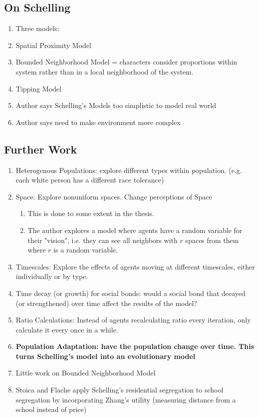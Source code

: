 \documentclass[11pt]{article}
\begin{document}
\subsection{On Schelling}
    \begin{enumerate}
        \item Three models:
        \item Spatial Proximity Model
        \item Bounded Neighborhood Model = characters consider proportions within system rather than in a local neighborhood of the system. 
        \item Tipping Model
        \item Author says Schelling's Models too simplistic to model real world
        \item Author says need to make environment more complex
    \end{enumerate}

\subsection{Further Work}
    \begin{enumerate}
        \item Heterogenous Populations: explore different types within population. (e.g. each white person has a different race tolerance)
        \item Space: Explore nonuniform spaces. Change perceptions of Space
            \begin{enumerate}
                \item This is done to some extent in the thesis. 
                \item The author explores a model where agents have a random variable for their "vision", i.e. they can see all neighbors with $r$ spaces from them where $r$ is a random variable. 
            \end{enumerate}
        \item Timescales: Explore the effects of agents moving at different timescales, either individually or by type.
        \item Time decay (or growth) for social bonds: would a social bond that decayed (or strengthened) over time affect the results of the model?
        \item Ratio Calculations: Instead of agents recalculating ratio every iteration, only calculate it every once in a while.
        \item \textbf{Population Adaptation: have the population change over time. This turns Schelling's model into an evolutionary model}
        \item Little work on Bounded Neighborhood Model
        \item Stoica and Flache apply Schelling's residential segregation to school segregation by incorporating Zhang's utility (measuring distance from a school instead of price)
    \end{enumerate}
\end{document}
